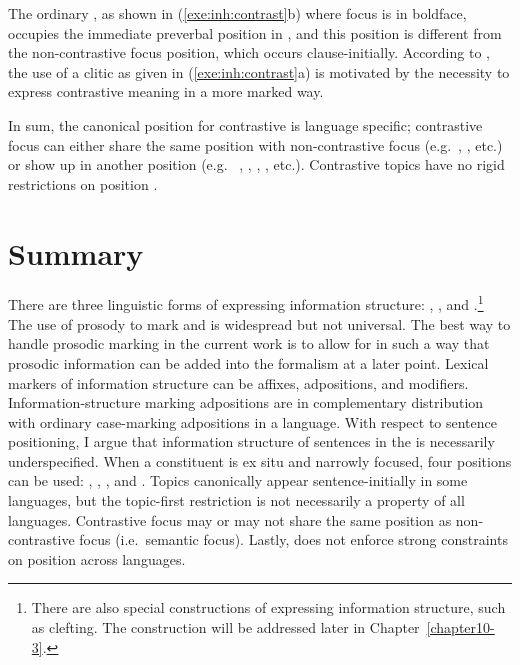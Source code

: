 \noindent The ordinary , as shown in
(\ref{exe:inh:contrast}b) where focus is in boldface, occupies the
immediate preverbal position in , and this position is
different from the non-contrastive focus position, which occurs
clause-initially.  According to \citeauthor{nichols:11}, the use of a
clitic as given in (\ref{exe:inh:contrast}a) is motivated by the
necessity to express contrastive meaning in a more marked way.



In sum, the canonical position for contrastive  is language
specific; contrastive focus can either share the same position with
non-contrastive focus (e.g.\ ,  \citep{gryllia:09},
etc.)  or show up in another position (e.g.\ 
\citep{ambar:99},  \citep{neeleman:titov:09},
 \citep{skopeteas:fanselow:10}, 
\citep{nichols:11}, etc.). Contrastive topics have no rigid
restrictions on position \citep{erteschik:07,bianchi:frascarelli:10}.


\section{Summary}
\label{4:sec:summary}


There are three linguistic forms of expressing information structure:
,  , and .\footnote{There are also 
special constructions of expressing information structure, such as clefting.
The construction will be addressed later in Chapter~\ref{chapter10-3}.} 
The use of prosody to mark  and
 is widespread but not universal. The best way to handle prosodic
marking in the current work is to allow for 
in such a way that prosodic information can be added into the formalism at
a later point. Lexical markers of information structure
can be affixes, adpositions, and modifiers. 
Information-structure marking adpositions are in
complementary distribution with ordinary case-marking adpositions in a
language. With respect to sentence positioning, I argue that
information structure of sentences in the  is
necessarily underspecified. When a constituent is ex situ and
narrowly focused, four positions can be used: ,
, , and .  Topics
canonically appear sentence-initially in some languages, but the
topic-first restriction is not necessarily a property of all
languages. Contrastive focus may or may not share the same position as
non-contrastive focus (i.e.\ semantic focus).
Lastly,  does not enforce strong 
constraints on position across languages.

